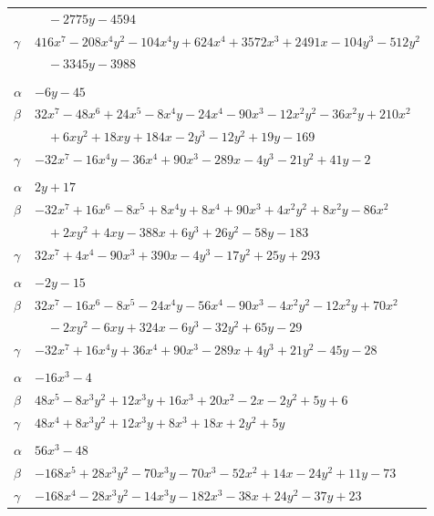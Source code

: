 \documentclass[11pt]{article}
\begin{document}
\begin{longtable}{@{}ll@{}}
 & $\quad -2775y-4594$\\
$\gamma$ & $416x^{7}-208x^{4}y^{2}-104x^{4}y+624x^{4}+3572x^{3}+2491x-104y^{3}-512y^{2}$\\
 & $\quad -3345y-3988$\\
\addlinespace[3pt]
\multicolumn{2}{@{}l}{$\{i,j\}=\{60,78\}$, $k_{ij}=3^{3}\cdot 11$}\\
$\alpha$ & $-6y-45$\\
$\beta$ & $32x^{7}-48x^{6}+24x^{5}-8x^{4}y-24x^{4}-90x^{3}-12x^{2}y^{2}-36x^{2}y+210x^{2}$\\
 & $\quad +6xy^{2}+18xy+184x-2y^{3}-12y^{2}+19y-169$\\
$\gamma$ & $-32x^{7}-16x^{4}y-36x^{4}+90x^{3}-289x-4y^{3}-21y^{2}+41y-2$\\
\addlinespace[3pt]
\multicolumn{2}{@{}l}{$\{i,j\}=\{61,63\}$, $k_{ij}=2\cdot 3^{2}\cdot 5$}\\
$\alpha$ & $2y+17$\\
$\beta$ & $-32x^{7}+16x^{6}-8x^{5}+8x^{4}y+8x^{4}+90x^{3}+4x^{2}y^{2}+8x^{2}y-86x^{2}$\\
 & $\quad +2xy^{2}+4xy-388x+6y^{3}+26y^{2}-58y-183$\\
$\gamma$ & $32x^{7}+4x^{4}-90x^{3}+390x-4y^{3}-17y^{2}+25y+293$\\
\addlinespace[3pt]
\multicolumn{2}{@{}l}{$\{i,j\}=\{61,78\}$, $k_{ij}=3^{2}\cdot 11$}\\
$\alpha$ & $-2y-15$\\
$\beta$ & $32x^{7}-16x^{6}-8x^{5}-24x^{4}y-56x^{4}-90x^{3}-4x^{2}y^{2}-12x^{2}y+70x^{2}$\\
 & $\quad -2xy^{2}-6xy+324x-6y^{3}-32y^{2}+65y-29$\\
$\gamma$ & $-32x^{7}+16x^{4}y+36x^{4}+90x^{3}-289x+4y^{3}+21y^{2}-45y-28$\\
\addlinespace[3pt]
\multicolumn{2}{@{}l}{$\{i,j\}=\{62,71\}$, $k_{ij}=2$}\\
$\alpha$ & $-16x^{3}-4$\\
$\beta$ & $48x^{5}-8x^{3}y^{2}+12x^{3}y+16x^{3}+20x^{2}-2x-2y^{2}+5y+6$\\
$\gamma$ & $48x^{4}+8x^{3}y^{2}+12x^{3}y+8x^{3}+18x+2y^{2}+5y$\\
\addlinespace[3pt]
\multicolumn{2}{@{}l}{$\{i,j\}=\{63,71\}$, $k_{ij}=2^{4}\cdot 3$}\\
$\alpha$ & $56x^{3}-48$\\
$\beta$ & $-168x^{5}+28x^{3}y^{2}-70x^{3}y-70x^{3}-52x^{2}+14x-24y^{2}+11y-73$\\
$\gamma$ & $-168x^{4}-28x^{3}y^{2}-14x^{3}y-182x^{3}-38x+24y^{2}-37y+23$\\

\end{longtable}
\end{document}
